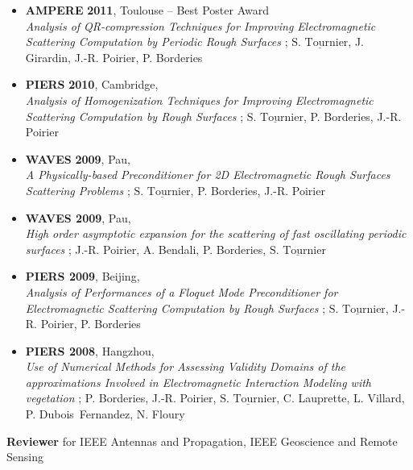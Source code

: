 \documentclass[a4paper,10pt,twoside]{article}
\newcommand\moi{$\underline{\textrm{S. Tournier}}$}
\begin{document}
\begin{itemize}
\item[\textbullet]
  \textbf{AMPERE}
  \textbf{2011}, Toulouse
  -- \textsf{Best Poster Award}\\
  \emph{Analysis of QR-compression
    Techniques for Improving Electromagnetic Scattering Computation by
    Periodic Rough Surfaces} ;
  \moi, J. Girardin, J.-R. Poirier, P. Borderies

\item[\textbullet]
  \textbf{PIERS}
  \textbf{2010}, Cambridge, \\
  \emph{Analysis of Homogenization Techniques for Improving
    Electromagnetic Scattering Computation by Rough Surfaces} ;
  \moi, P. Borderies, J.-R. Poirier

\item[\textbullet]
  \textbf{WAVES}
  \textbf{2009}, Pau,\\
  \emph{A Physically-based Preconditioner for 2D Electromagnetic Rough
    Surfaces Scattering Problems} ;
  \moi, P. Borderies, J.-R. Poirier

\item[\textbullet]
  \textbf{WAVES 2009}, Pau,\\
  \emph{High order asymptotic expansion for the scattering of fast
    oscillating periodic surfaces} ;
  J.-R. Poirier, A. Bendali, P. Borderies,  \moi

\item[\textbullet]
  \textbf{PIERS 2009}, Beijing,\\
  \emph{Analysis of Performances of a Floquet Mode Preconditioner for
    Electromagnetic Scattering Computation by Rough Surfaces} ;
  \moi, J.-R. Poirier, P. Borderies

\item[\textbullet]
  \textbf{PIERS 2008}, Hangzhou,\\
  \emph{Use of Numerical Methods for Assessing Validity Domains of the
    approximations Involved in Electromagnetic Interaction Modeling
    with vegetation} ;
  P. Borderies, J.-R. Poirier, \moi, C. Lauprette, L. Villard, P. Dubois~Fernandez, N. Floury
\end{itemize}

\vspace{0.1cm}

\noindent
\textbf{Reviewer} for
IEEE Antennas and Propagation,
IEEE Geoscience and Remote Sensing
\end{document}
